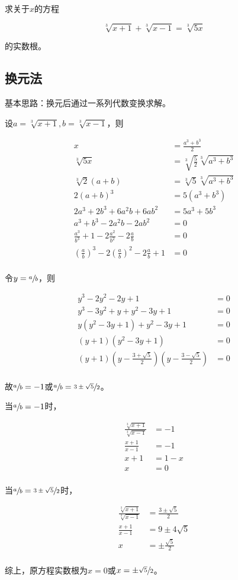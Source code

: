 

求关于$x$的方程

\[ \sqrt[3]{x + 1} + \sqrt[3]{x - 1} = \sqrt[3]{5x} \]

的实数根。


\subsection{换元法}

基本思路：换元后通过一系列代数变换求解。

设$a = \sqrt[3]{x + 1}, b = \sqrt[3]{x - 1}$，则

\begin{align*}
  x &= \frac{a^3 + b^3}2 \\
  \sqrt[3]{5x} &= \sqrt[3]{\frac52}\sqrt[3]{a^3 + b^3} \\
  \sqrt[3]2(a + b) &= \sqrt[3]5\sqrt[3]{a^3 + b^3} \\
  2(a + b)^3 &= 5(a^3 + b^3) \\
  2a^3 + 2b^3 + 6a^2b + 6ab^2 &= 5a^3 + 5b^3 \\
  a^3 + b^3 - 2a^2b - 2ab^2 &= 0 \\
  \frac{a^3}{b^3} + 1 - 2\frac{a^2}{b^2} - 2\frac ab &= 0 \\
  \left(\frac ab\right)^3 - 2\left(\frac ab\right)^2 - 2\frac ab + 1 &= 0 \\
\end{align*}

令$y = \sfrac ab$，则

\begin{align*}
  y^3 - 2y^2 - 2y + 1 &= 0 \\
  y^3 - 3y^2 + y + y^2 - 3y + 1 &= 0 \\
  y(y^2 - 3y + 1) + y^2 - 3y + 1 &= 0 \\
  (y + 1)(y^2 - 3y + 1) &= 0 \\
  (y + 1)\left(y - \frac{3 + \sqrt5}2\right)\left(y - \frac{3 - \sqrt5}2\right) &= 0 \\
\end{align*}

故$\sfrac ab = -1$或$\sfrac ab = \sfrac{3 \pm\sqrt5}2$。

当$\sfrac ab = -1$时，

\begin{align*}
  \frac{\sqrt[3]{x + 1}}{\sqrt[3]{x - 1}} &= -1 \\
  \frac{x + 1}{x - 1} &= -1 \\
  x + 1 &= 1 - x \\
  x &= 0 \\
\end{align*}

当$\sfrac ab = \sfrac{3 \pm\sqrt5}2$时，

\begin{align*}
  \frac{\sqrt[3]{x + 1}}{\sqrt[3]{x - 1}} &= \frac{3 \pm\sqrt5}2 \\
  \frac{x + 1}{x - 1} &= 9 \pm4\sqrt5 \\
  x &= \pm\frac{\sqrt5}2 \\
\end{align*}

综上，原方程实数根为$x = 0$或$x = \pm\sfrac{\sqrt5}2$。
